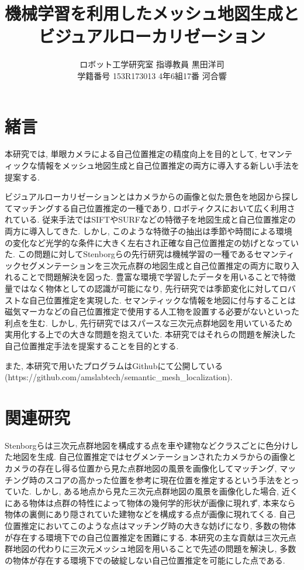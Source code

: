 \documentclass[letterpaper, 9 pt, conference]{ieeeconf}
\title{\LARGE \bf
機械学習を利用したメッシュ地図生成とビジュアルローカリゼーション
}
\author{
ロボット工学研究室 指導教員 黒田洋司\\
学籍番号 153R173013 4年6組17番 河合響
}
\begin{document}
\maketitle
\thispagestyle{empty}
\pagestyle{empty}


\section{緒言}
本研究では, 単眼カメラによる自己位置推定の精度向上を目的として, セマンティックな情報をメッシュ地図生成と自己位置推定の両方に導入する新しい手法を提案する. \par
ビジュアルローカリゼーションとはカメラからの画像と似た景色を地図から探してマッチングする自己位置推定の一種であり, ロボティクスにおいて広く利用されている. 従来手法ではSIFTやSURFなどの特徴子を地図生成と自己位置推定の両方に導入してきた\cite{vslam_survey}. しかし, このような特徴子の抽出は季節や時間による環境の変化など光学的な条件に大きく左右され正確な自己位置推定の妨げとなっていた. この問題に対してStenborgらの先行研究\cite{semantic_point_localization}は機械学習の一種であるセマンティックセグメンテーションを三次元点群の地図生成と自己位置推定の両方に取り入れることで問題解決を図った. 豊富な環境で学習したデータを用いることで特徴量ではなく物体としての認識が可能になり, 先行研究では季節変化に対してロバストな自己位置推定を実現した. セマンティックな情報を地図に付与することは磁気マーカなどの自己位置推定で使用する人工物を設置する必要がないといった利点を生む. しかし, 先行研究ではスパースな三次元点群地図を用いているため実用化する上での大きな問題を抱えていた. 本研究ではそれらの問題を解決した自己位置推定手法を提案することを目的とする. \par また, 本研究で用いたプログラムはGithubにて公開している(https://github.com/amslabtech/semantic\_mesh\_localization).

\section{関連研究}\label{sec:related_work}
Stenborgら\cite{semantic_point_localization}は三次元点群地図を構成する点を車や建物などクラスごとに色分けした地図を生成. 自己位置推定ではセグメンテーションされたカメラからの画像とカメラの存在し得る位置から見た点群地図の風景を画像化してマッチング, マッチング時のスコアの高かった位置を参考に現在位置を推定するという手法をとっていた. しかし, ある地点から見た三次元点群地図の風景を画像化した場合, 近くにある物体は点群の特性によって物体の幾何学的形状が画像に現れず, 本来なら物体の裏側にあり隠されていた建物などを構成する点が画像に現れてくる. 自己位置推定においてこのような点はマッチング時の大きな妨げになり, 多数の物体が存在する環境下での自己位置推定を困難にする. 本研究の主な貢献は三次元点群地図の代わりに三次元メッシュ地図を用いることで先述の問題を解決し, 多数の物体が存在する環境下での破綻しない自己位置推定を可能にした点である.
\end{document}
